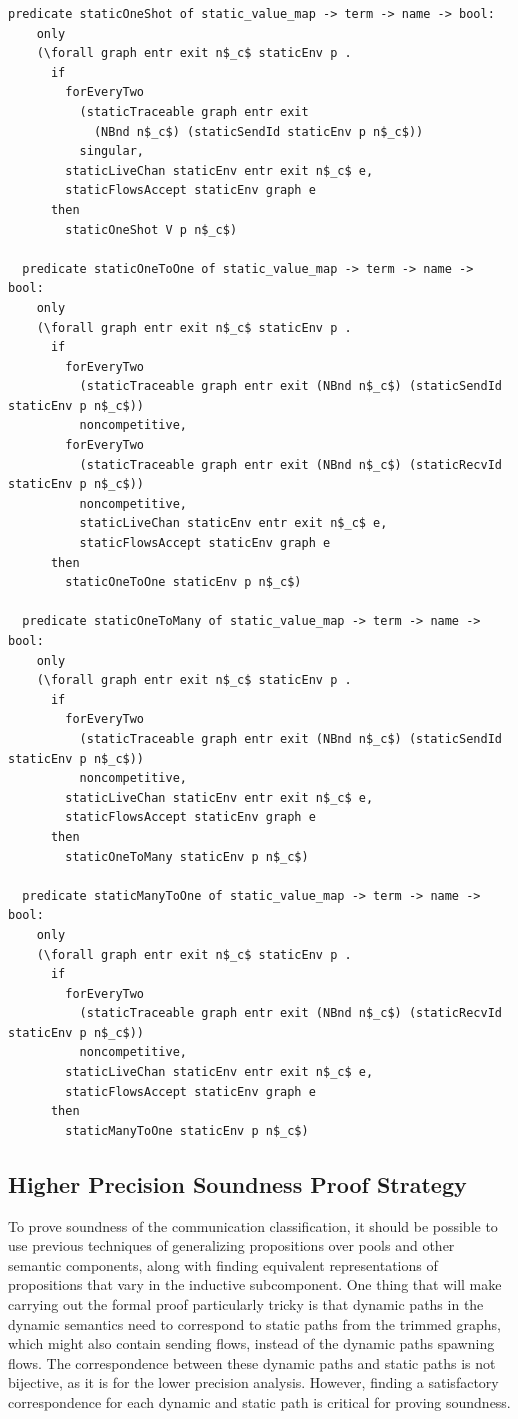 \documentclass[10pt]{article}
\begin{document}
\begin{lstlisting}[language=logic, mathescape]
  predicate staticOneShot of static_value_map -> term -> name -> bool:
    only
    (\forall graph entr exit n$_c$ staticEnv p . 
      if
        forEveryTwo
          (staticTraceable graph entr exit
            (NBnd n$_c$) (staticSendId staticEnv p n$_c$))
          singular, 
        staticLiveChan staticEnv entr exit n$_c$ e, 
        staticFlowsAccept staticEnv graph e
      then
        staticOneShot V p n$_c$)

  predicate staticOneToOne of static_value_map -> term -> name -> bool:
    only
    (\forall graph entr exit n$_c$ staticEnv p .
      if
        forEveryTwo
          (staticTraceable graph entr exit (NBnd n$_c$) (staticSendId staticEnv p n$_c$))
          noncompetitive, 
        forEveryTwo
          (staticTraceable graph entr exit (NBnd n$_c$) (staticRecvId staticEnv p n$_c$))
          noncompetitive,
          staticLiveChan staticEnv entr exit n$_c$ e,
          staticFlowsAccept staticEnv graph e
      then
        staticOneToOne staticEnv p n$_c$)

  predicate staticOneToMany of static_value_map -> term -> name -> bool:
    only
    (\forall graph entr exit n$_c$ staticEnv p .
      if
        forEveryTwo
          (staticTraceable graph entr exit (NBnd n$_c$) (staticSendId staticEnv p n$_c$))
          noncompetitive,
        staticLiveChan staticEnv entr exit n$_c$ e,
        staticFlowsAccept staticEnv graph e
      then
        staticOneToMany staticEnv p n$_c$)

  predicate staticManyToOne of static_value_map -> term -> name -> bool:
    only
    (\forall graph entr exit n$_c$ staticEnv p .
      if
        forEveryTwo
          (staticTraceable graph entr exit (NBnd n$_c$) (staticRecvId staticEnv p n$_c$))
          noncompetitive, 
        staticLiveChan staticEnv entr exit n$_c$ e,
        staticFlowsAccept staticEnv graph e
      then
        staticManyToOne staticEnv p n$_c$)
  \end{lstlisting}


\subsection{Higher Precision Soundness Proof Strategy}
To prove soundness of the communication classification, it should be possible to use
previous techniques of generalizing propositions over pools and other semantic components,
along with finding equivalent representations of propositions that vary in the inductive
subcomponent. One thing that will make carrying out the formal proof particularly tricky is
that dynamic paths in the dynamic semantics need to correspond to static paths from
the trimmed graphs, which might also contain sending flows,
instead of the dynamic paths spawning flows.
The correspondence between these dynamic paths and static paths
is not bijective, as it is for the lower precision analysis. However, finding a satisfactory
correspondence for each dynamic and static path is critical for proving soundness.
\end{document}
